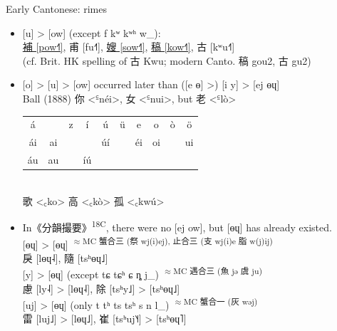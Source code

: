 \documentclass{beamer}
\begin{document}
\begin{frame}[fragile]{Early Cantonese: rimes}

{\footnotesize
\begin{itemize}
    \item {[u] > [ow] (except f kʷ kʷʰ w\_):}\\
    \underline{補 [pow˧˥]}, 甫 [fu˧˥], \underline{嫂 [sow˧˥]}, \underline{稿 [kow˧˥]}, 古 [kʷu˧˥]\\
    (cf. Brit. HK spelling of 古 Kwu; modern Canto. 稿 gou2, 古 gu2)\\
    \item {[o] > [u] > [ow] occurred later than ([e ɵ] >) [i y] > [ej ɵɥ]}\\
    Ball (1888) 你 <꜃néi>, 女 <꜃nui>, but 老 <꜃lò>\\
    \begin{tabular}{c c c c c c c c c c}
        \hline
        á & & z & í & ú & ü & e & o & ò & ö\\
        ái & ai & & & úí & & éi & oi & & ui\\
        áu & au & & íú & & & & & & \\ \hline
    \end{tabular}\\
    歌 <꜀ko> 高 <꜀kò> 孤 <꜀kwú>\\
    \item In《分韻撮要》\textsuperscript{18C}, there were no [ej ow], but [ɵɥ] has already existed.\\
    {[ɵɥ] > [ɵɥ]} \textsuperscript{$\approx$MC 蟹合三 (祭 wj(i)ej), 止合三 (支 wj(i)e 脂 w(j)ij)}\\
    \quad 戾 [lɵɥ˨], 隨 [tsʰɵɥ˩]\\
    {[y] > [ɵɥ] (except tɕ tɕʰ ɕ ȵ j\_)} \textsuperscript{$\approx$MC 遇合三 (魚 jə 虞 ju)}\\
    \quad 慮 [ly˨] > [lɵɥ˨], 除 [tsʰy˩] > [tsʰɵɥ˩]\\
    {[uj] > [ɵɥ] (only t tʰ ts tsʰ s n l\_)} \textsuperscript{$\approx$MC 蟹合一 (灰 wəj)}\\
    \quad 雷 [luj˩] > [lɵɥ˩], 崔 [tsʰuj˥˧] > [tsʰɵɥ˥]\\
\end{itemize}}

\end{frame}
\end{document}
